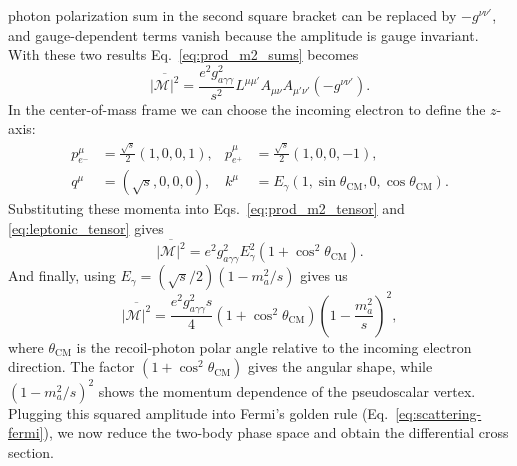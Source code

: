 \documentclass[12pt,a4paper]{article}
\begin{document}
photon polarization sum in the second square bracket can be replaced by
$-g^{\nu\nu'}$, and gauge-dependent terms vanish because the amplitude is gauge
invariant. With these two results Eq.~\eqref{eq:prod_m2_sums} becomes
\begin{equation}
    \overline{|\mathcal{M}|^2}
    =
    \frac{e^2g_{a\gamma\gamma}^2}{s^2}
    L^{\mu\mu'}
    A_{\mu\nu}A_{\mu'\nu'}
    \left(-g^{\nu\nu'}\right).
    \label{eq:prod_m2_tensor}
\end{equation}
In the center-of-mass frame we can choose the incoming electron to define the
$z$-axis:
\begin{align}
    p_{e^-}^\mu
    &=
    \frac{\sqrt{s}}{2}(1,0,0,1),
    &
    p_{e^+}^\mu
    &=
    \frac{\sqrt{s}}{2}(1,0,0,-1),
    \nonumber\\
    q^\mu
    &=
    (\sqrt{s},0,0,0),
    &
    k^\mu
    &=
    E_\gamma(1,\sin\theta_\mathrm{CM},0,\cos\theta_\mathrm{CM}).
    \label{eq:cm_momenta}
\end{align}
Substituting these momenta into Eqs.~\eqref{eq:prod_m2_tensor} and
\eqref{eq:leptonic_tensor} gives
\begin{equation}
    \overline{|\mathcal{M}|^2}
    =
    e^2g_{a\gamma\gamma}^2 E_\gamma^2
    \left(1+\cos^2\theta_\mathrm{CM}\right).
    \label{eq:prod_m2_egamma}
\end{equation}
And finally, using $E_\gamma=(\sqrt{s}/2)(1-m_{a}^2/s)$ gives us
\begin{equation}
    \overline{|\mathcal{M}|^2}
    =
    \frac{e^2g_{a\gamma\gamma}^2s}{4}
    \left(1+\cos^2\theta_\mathrm{CM}\right)
    \left(1-\frac{m_{a}^2}{s}\right)^2,
    \label{eq:prod_m2}
\end{equation}
where $\theta_\mathrm{CM}$ is the recoil-photon polar angle relative to the
incoming electron direction. The factor $(1+\cos^2\theta_\mathrm{CM})$ gives
the angular shape, while $(1-m_{a}^2/s)^2$ shows the momentum dependence of the
pseudoscalar vertex. Plugging this squared amplitude into Fermi's golden rule
(Eq.~\eqref{eq:scattering-fermi}), we now reduce the two-body phase space and
obtain the differential cross section.
\end{document}
